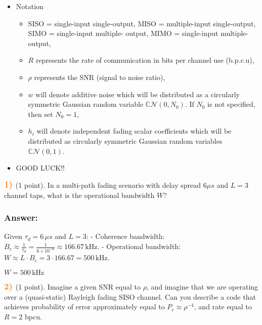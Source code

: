 \documentclass[11pt]{article}
\providecommand{\tightlist}{%
      \setlength{\itemsep}{0pt}\setlength{\parskip}{0pt}}
\begin{document}
\begin{itemize}
\tightlist
\item
  Notation

  \begin{itemize}
  \tightlist
  \item
    SISO = single-input single-output, MISO = multiple-input
    single-output, SIMO = single-input multiple- output, MIMO =
    single-input multiple-output,
  \item
    \(R\) represents the rate of communication in bits per channel use
    (b.p.c.u),
  \item
    \(\rho\) represents the SNR (signal to noise ratio),
  \item
    \(w\) will denote additive noise which will be distributed as a
    circularly symmetric Gaussian random variable
    \(\mathbb{C}\mathcal{N}(0,N_0)\). If \(N_0\) is not specified, then
    set \(N_0 = 1\),
  \item
    \(h_i\) will denote independent fading scalar coefficients which
    will be distributed as circularly symmetric Gaussian random
    variables \(\mathbb{C}\mathcal{N}(0,1)\).
  \end{itemize}
\item
  GOOD LUCK!!
\end{itemize}

    \(\color{orange} \large \textbf{1)}\) (1 point). In a multi-path fading
scenario with delay spread \(6\mu s\) and \(L = 3\) channel taps, what
is the operational bandwidth \(W\)?

    \subsubsection{\texorpdfstring{\textbf{Answer}:}{Answer:}}\label{answer}

Given \(\tau_d = 6 \, \mu s\) and \(L = 3\): - Coherence bandwidth:
\(B_c \approx \frac{1}{\tau_d} = \frac{1}{6 \times 10^{-6}} \approx 166.67 \, \text{kHz}\).
- Operational bandwidth:
\(W \approx L \cdot B_c  = 3 \cdot 166.67 = 500 \, \text{kHz}\).

\(\boxed{W = 500 \, \text{kHz}}\)

    \(\color{orange} \large \textbf{2)}\) (1 point). Imagine a given SNR
equal to \(\rho\), and imagine that we are operating over a
(quasi-static) Rayleigh fading SISO channel. Can you describe a code
that achieves probability of error approximately equal to
\(P_e \approx \rho^{−4}\), and rate equal to \(R = 2\) bpcu.
\end{document}
